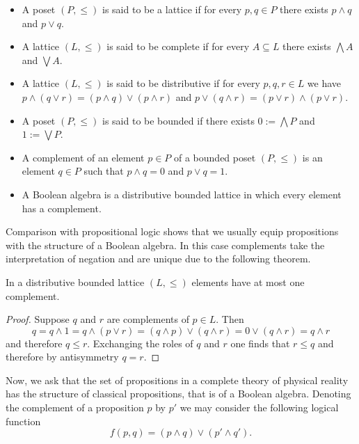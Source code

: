\begin{definition}

\begin{itemize}
\item A poset $(P,\leq)$ is said to be a lattice if for every $p,q\in P$ there exists $p\wedge q$ and $p\vee q$.
\item A lattice $(L,\leq)$ is said to be complete if for every $A\subseteq L$ there exists $\bigwedge A$ and $\bigvee A$.
\item A lattice $(L,\leq)$ is said to be distributive if for every $p,q,r\in L$ we have $p\wedge (q\vee r)=(p\wedge q)\vee (p\wedge r)$ and $p\vee (q\wedge r)=(p\vee r)\wedge (p\vee r)$.
\item A poset $(P,\leq)$ is said to be bounded if there exists $0:=\bigwedge P$ and $1:=\bigvee P$.
\item A complement of an element $p\in P$ of a bounded poset $(P,\leq)$ is an element $q\in P$ such that $p\wedge q = 0$ and $p\vee q = 1$.
\item A Boolean algebra is a distributive bounded lattice in which every element has a complement.  
\end{itemize}

\end{definition}

Comparison with propositional logic shows that we usually equip propositions with the structure of a Boolean algebra. In this case complements take the interpretation of negation and are unique due to the following theorem.

\begin{theorem}\label{thm:distributive}
In a distributive bounded lattice $(L,\leq)$ elements have at most one complement.
\end{theorem}

\begin{proof}
Suppose $q$ and $r$ are complements of $p\in L$. Then
\begin{equation}
q = q\wedge 1 = q\wedge (p\vee r) =(q\wedge p)\vee(q\wedge r) = 0\vee(q\wedge r)=q\wedge r 
\end{equation}
and therefore $q\leq r$. Exchanging the roles of $q$ and $r$ one finds that $r\leq q$ and therefore by antisymmetry $q=r$.
\end{proof}

Now, we ask that the set of propositions in a complete theory of physical reality has the structure of classical propositions, that is of a Boolean algebra. Denoting the complement of a proposition $p$ by $p'$ we may consider the following logical function
\begin{equation}
f(p,q)=(p\wedge q)\vee (p' \wedge q').
\end{equation}

